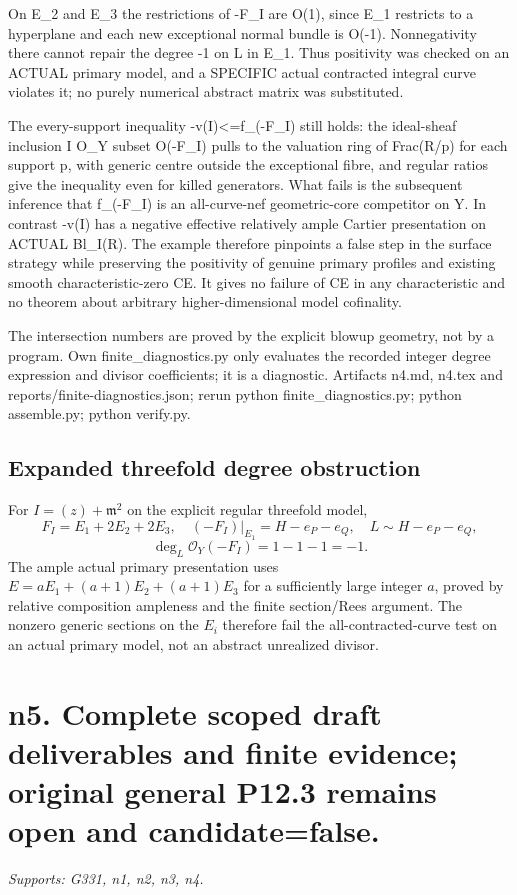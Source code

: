 \documentclass[11pt]{article}
\begin{document}
On E\_2 and E\_3 the restrictions of -F\_I are O(1), since E\_1 restricts to a hyperplane and each new exceptional normal bundle is O(-1). Nonnegativity there cannot repair the degree -1 on L in E\_1. Thus positivity was checked on an ACTUAL primary model, and a SPECIFIC actual contracted integral curve violates it; no purely numerical abstract matrix was substituted.

The every-support inequality -v(I)\textless{}=f\_(-F\_I) still holds: the ideal-sheaf inclusion I O\_Y subset O(-F\_I) pulls to the valuation ring of Frac(R/p) for each support p, with generic centre outside the exceptional fibre, and regular ratios give the inequality even for killed generators. What fails is the subsequent inference that f\_(-F\_I) is an all-curve-nef geometric-core competitor on Y. In contrast -v(I) has a negative effective relatively ample Cartier presentation on ACTUAL Bl\_I(R). The example therefore pinpoints a false step in the surface strategy while preserving the positivity of genuine primary profiles and existing smooth characteristic-zero CE. It gives no failure of CE in any characteristic and no theorem about arbitrary higher-dimensional model cofinality.

The intersection numbers are proved by the explicit blowup geometry, not by a program. Own finite\_diagnostics.py only evaluates the recorded integer degree expression and divisor coefficients; it is a diagnostic. Artifacts n4.md, n4.tex and reports/finite-diagnostics.json; rerun python finite\_diagnostics.py; python assemble.py; python verify.py.

\subsection*{Expanded threefold degree obstruction}
For $I=(z)+\mathfrak m^2$ on the explicit regular threefold model,
\[
F_I=E_1+2E_2+2E_3,\quad
(-F_I)|_{E_1}=H-e_P-e_Q,\quad L\sim H-e_P-e_Q,
\]
\[
\deg_L\mathcal O_Y(-F_I)=1-1-1=-1.
\]
The ample actual primary presentation uses
$E=aE_1+(a+1)E_2+(a+1)E_3$ for a sufficiently large integer $a$,
proved by relative composition ampleness and the finite section/Rees
argument. The nonzero generic sections on the $E_i$ therefore fail the
all-contracted-curve test on an actual primary model, not an abstract
unrealized divisor.


\section{n5. Complete scoped draft deliverables and finite evidence; original general P12.3 remains open and candidate=false.}
\textit{Supports: G331, n1, n2, n3, n4.}
\end{document}
